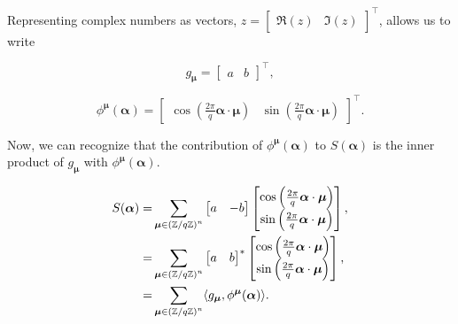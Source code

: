 \noindent
Representing complex numbers as vectors, $z = \begin{bmatrix} \Re(z) & \Im(z) \end{bmatrix}^\intercal$, allows us to write

\begin{equation}
    g_{\boldsymbol{\mu}} = \begin{bmatrix} a & b \end{bmatrix}^\intercal,
\end{equation}

\begin{equation}
    \phi^{\boldsymbol{\mu}}(\boldsymbol{\alpha}) = \begin{bmatrix} \cos \left( \frac{2\pi}{q} \boldsymbol{\alpha} \cdot \boldsymbol{\mu}\right) & \sin \left( \frac{2\pi}{q} \boldsymbol{\alpha} \cdot \boldsymbol{\mu}\right) \end{bmatrix}^\intercal.
\end{equation}

\noindent
Now, we can recognize that the contribution of $\phi^{\boldsymbol{\mu}}(\boldsymbol{\alpha})$ to $S(\boldsymbol{\alpha})$ is the inner product of $g_{\boldsymbol{\mu}}$ with $\phi^{\boldsymbol{\mu}}(\boldsymbol{\alpha})$.

\begin{align}
    S(\boldsymbol{\alpha}) =& \sum_{\boldsymbol{\mu} \in {(\mathbb{Z}/q\mathbb{Z})}^n} \begin{bmatrix}
        a & -b
    \end{bmatrix}\begin{bmatrix}
        \cos \left( \frac{2\pi}{q} \boldsymbol{\alpha} \cdot \boldsymbol{\mu}\right) \\ \sin \left( \frac{2\pi}{q} \boldsymbol{\alpha} \cdot \boldsymbol{\mu}\right)
    \end{bmatrix}, \notag \\
    =& \sum_{\boldsymbol{\mu} \in {(\mathbb{Z}/q\mathbb{Z})}^n} \begin{bmatrix}
        a & b
    \end{bmatrix}^*\begin{bmatrix}
        \cos \left( \frac{2\pi}{q} \boldsymbol{\alpha} \cdot \boldsymbol{\mu}\right) \\ \sin \left( \frac{2\pi}{q} \boldsymbol{\alpha} \cdot \boldsymbol{\mu}\right)
    \end{bmatrix}, \notag \\
    =& \sum_{\boldsymbol{\mu} \in {(\mathbb{Z}/q\mathbb{Z})}^n} \langle g_{\boldsymbol{\mu}}, \phi^{\boldsymbol{\mu}}(\boldsymbol{\alpha}) \rangle.
\end{align}

